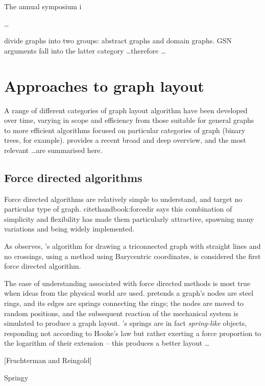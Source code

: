 The annual symposium i

\ldots

\citet{huang2007effects} divide graphs into two groups: abstract graphs and domain graphs.
GSN arguments fall into the latter category \ldots  therefore \ldots





\section{Approaches to graph layout}

A range of different categories of graph layout algorithm have been developed over time, varying in scope and efficiency from those suitable for general graphs to more efficient algorithms focused on particular categories of graph (binary trees, for example).
\citet{handbook} provides a recent broad and deep overview, and the most relevant \ldots are summarised here.


\subsection{Force directed algorithms}

Force directed algorithms are relatively simple to understand, and target no particular type of graph. 
citet{handbook:forcedir} says this combination of simplicity and flexibility has made them particularly attractive,
spawning many variations and being widely implemented.

As \citet{handbook:forcedir} observes, \citet{tutte}'s algorithm for drawing a triconnected graph with straight lines and no crossings,  using a method using Barycentric coordinates, is considered the first force directed algorithm.

The ease of understanding associated with force directed methods is most true when ideas from the physical world are used. \citet{eades84} pretends a graph's nodes are steel rings, and its edges are springs connecting the rings; the nodes are moved to random positions, and the subsequent reaction of the mechanical system is simulated to produce a graph layout. \cite{eades84}'s springs are in fact \emph{spring-like} objects, responding not according to Hooke's law but rather exerting a force proportion to the logarithm of their extension -- this produces a better layout \ldots

[Fruchterman and Reingold]

Springy

